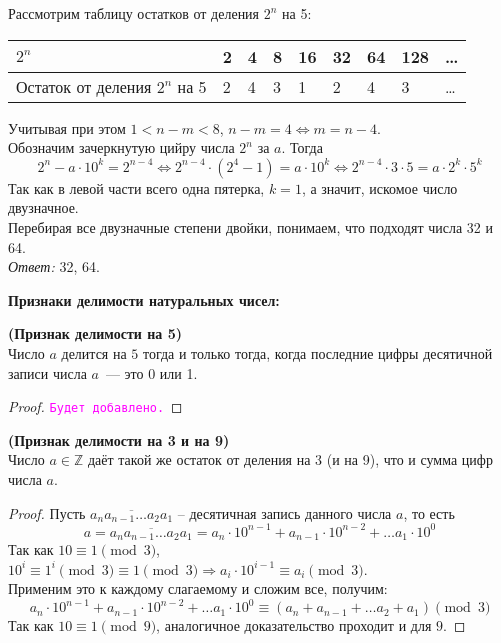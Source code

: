 \documentclass[11pt]{article}
\begin{document}
Рассмотрим таблицу остатков от деления $2^n$ на 5:

\begin{center}
\begin{tabular}{ | l | l | l | l | l | l | l | l | l |}
\hline
$2^n$ & 2 & 4 & 8 & 16 & 32 & 64 & 128 & \ldots \\ \hline
Остаток от деления $2^n$ на 5   & 2 & 4 & 3 & 1 & 2 & 4 & 3 & \ldots\\\hline
\end{tabular}
\end{center}

Учитывая при этом $1 < n - m < 8 $, $n - m = 4 \Leftrightarrow m = n - 4$.\\
Обозначим зачеркнутую цийру числа $2^n$ за $a$. Тогда
\[2^n - a \cdot 10^k = 2^{n - 4} \Leftrightarrow
2^{n - 4} \cdot (2^{4} - 1) = a \cdot 10^k \Leftrightarrow
2^{n - 4} \cdot 3 \cdot 5 = a \cdot 2^k \cdot 5^k \]
Так как в левой части всего одна пятерка, $k = 1$, а значит, искомое число двузначное.\\
Перебирая все двузначные степени двойки, понимаем, что подходят числа 32 и 64.\\
\textit{Ответ:} 32, 64.

\textbf{Признаки делимости натуральных чисел:}

\begin{theorem} \textbf{(Признак делимости на 5)}\\
	Число $a$ делится на $5$ тогда и только тогда, когда последние цифры десятичной записи числа $a$~--- это 0 или 1.
\end{theorem}
\begin{proof}
    \textcolor{magenta}{\texttt{Будет добавлено.}}
\end{proof}

\begin{theorem}\textbf{(Признак делимости на 3 и на 9)}\\
	Число $a \in \mathbb{Z}$ даёт такой же остаток от деления на 3 (и на 9), что и сумма цифр числа $a$.
\end{theorem}

\begin{proof}

	Пусть $\overline{a_na_{n - 1}\ldots a_2 a_1}$ -- десятичная запись данного числа $a$, то есть
	\[a = \overline{a_na_{n - 1}\ldots a_2 a_1} = a_n \cdot 10^{n - 1} + a_{n - 1}\cdot 10^{n - 2} + \ldots a_1 \cdot 10^0 \]
	Так как $10 \equiv 1 \pmod 3$, $10^{i} \equiv 1^{i} \pmod 3 \equiv 1 \pmod 3 \Rightarrow a_i \cdot 10^{i - 1} \equiv a_i \pmod 3$.  \\
	Применим это к каждому слагаемому и сложим все, получим:\\
	\[a_n \cdot 10^{n - 1} + a_{n - 1}\cdot 10^{n - 2} + \ldots a_1 \cdot 10^0 \equiv (a_n + a_{n - 1} + \ldots  a_2 + a_1) \pmod 3\]
	Так как $10 \equiv 1 \pmod{9}$, аналогичное доказательство проходит и для $9$.

\end{proof}
\end{document}
